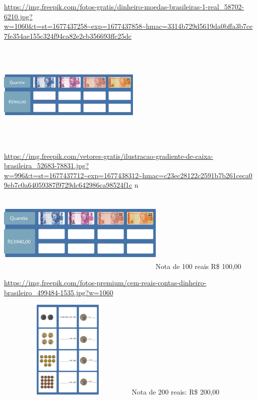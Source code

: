 \begin{escolha}
{\url{https://img.freepik.com/fotos-gratis/dinheiro-moedas-brasileiras-1-real_58702-6210.jpg?w=1060\&t=st=1677437258~exp=1677437858~hmac=3314b729d5619da0bffa3b7ce7fe354ae155c324f94ca82e2cb356693ffc25dc}

\includegraphics[width=2.71068in,height=1.97500in]{media/image69.png}%

\url{https://img.freepik.com/vetores-gratis/ilustracao-gradiente-de-caixa-brasileira_52683-78831.jpg?w=996\&t=st=1677437712~exp=1677438312~hmac=c23ec28122c2591b7b261ceca09eb7c0a64059387f9729dc642986ca98524f1c}
n

\includegraphics[width=3.18285in,height=1.50833in]{media/image70.png}Nota
de 100 reais R\$ 100,00

\url{https://img.freepik.com/fotos-premium/cem-reais-contas-dinheiro-brasileiro_499484-1535.jpg?w=1060}

\includegraphics[width=2.68333in,height=1.88913in]{media/image71.png}Nota
de 200 reais: R\$ 200,00

}
\end{escolha}
